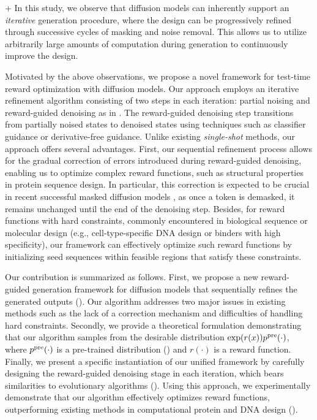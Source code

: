 +
In this study, we observe that diffusion models can inherently support an \emph{iterative} generation procedure, where the design can be progressively refined through successive cycles of masking and noise removal. This allows us to utilize arbitrarily large amounts of computation during generation to continuously improve the design. 



Motivated by the above observations, we propose a novel framework for test-time reward optimization with diffusion models. Our approach employs an iterative refinement algorithm consisting of two steps in each iteration: partial noising and reward-guided denoising as in . The reward-guided denoising step transitions from partially noised states to denoised states using techniques such as classifier guidance or derivative-free guidance. Unlike existing \emph{single-shot} methods, our approach offers several advantages. First, our sequential refinement process allows for the gradual correction of errors introduced during reward-guided denoising, enabling us to optimize complex reward functions, such as structural properties in protein sequence design. In particular, this correction is expected to be crucial in recent successful masked diffusion models \citep{sahoo2024simple,shi2024simplified}, as once a token is demasked, it remains unchanged until the end of the denoising step. Besides, for reward functions with hard constraints, commonly encountered in biological sequence or molecular design (e.g., cell-type-specific DNA design \citep{gosai2023machine,lal2024reglm} or binders with high specificity), our framework can effectively optimize such reward functions by initializing seed sequences within feasible regions that satisfy these constraints.

{ Our contribution is summarized as follows. First, we propose a new reward-guided generation framework for diffusion models that sequentially refines the generated outputs (). Our algorithm addresses two major issues in existing methods such as the lack of a correction mechanism and difficulties of handling hard constraints. Secondly, we provide a theoretical formulation demonstrating that our algorithm samples from the desirable distribution $\exp(r(x))p^{\mathrm{pre}}(\cdot)$, where $p^{\mathrm{pre}}(\cdot)$ is a pre-trained distribution () and $r(\cdot)$ is a reward function.
Finally, we present a specific instantiation of our unified framework by carefully designing the reward-guided denoising stage in each iteration, which bears similarities to evolutionary algorithms (). Using this approach, we experimentally demonstrate that our algorithm effectively optimizes reward functions, outperforming existing methods in computational protein and DNA design ().} 
